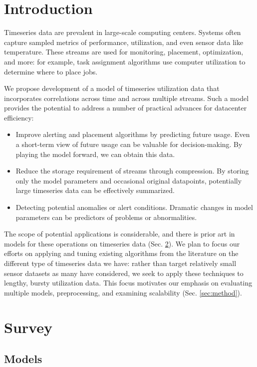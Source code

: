 \section{Introduction}
\label{sec:intro}
Timeseries data are prevalent in large-scale computing centers. Systems often capture sampled metrics of performance, utilization, and even sensor data like temperature. These streams are used for monitoring, placement, optimization, and more: for example, task assignment algorithms use computer utilization to determine where to place jobs.

We propose development of a model of timeseries utilization data that incorporates correlations across time and across multiple streams. Such a model provides the potential to address a number of practical advances for datacenter efficiency:
\begin{itemize}
\item Improve alerting and placement algorithms by predicting future usage. Even a short-term view of future usage can be valuable for decision-making. By playing the model forward, we can obtain this data.
\item Reduce the storage requirement of streams through compression. By storing only the model parameters and occasional original datapoints, potentially large timeseries data can be effectively summarized.
\item Detecting potential anomalies or alert conditions. Dramatic changes in model parameters can be predictors of problems or abnormalities.
\end{itemize}

The scope of potential applications is considerable, and there is prior art in models for these operations on timeseries data (Sec. \ref{sec:survey}). We plan to focus our efforts on applying and tuning existing algorithms from the literature on the different type of timeseries data we have: rather than target  relatively small sensor datasets as many have considered, we seek to apply these techniques to lengthy, bursty utilization data. This focus motivates our emphasis on evaluating multiple models, preprocessing, and examining scalability (Sec. \ref{sec:method}).

\section{Survey}
\label{sec:survey}

\subsection{Models}

